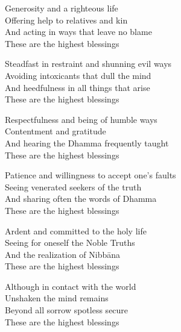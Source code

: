 \begin{english-only}
  Generosity and a righteous life\\
  Offering help to relatives and kin\\
  And acting in ways that leave no blame\\
  These are the highest blessings
\end{english-only}

\begin{english-only}
  Steadfast in restraint and shunning evil ways\\
  Avoiding intoxicants that dull the mind\\
  And heedfulness in all things that arise\\
  These are the highest blessings
\end{english-only}

\begin{english-only}
  Respectfulness and being of humble ways\\
  Contentment and gratitude\\
  And hearing the Dhamma frequently taught\\
  These are the highest blessings
\end{english-only}

\begin{english-only}
  Patience and willingness to accept one's faults\\
  Seeing venerated seekers of the truth\\
  And sharing often the words of Dhamma\\
  These are the highest blessings
\end{english-only}

\begin{english-only}
  Ardent and committed\makeatletter\hyperlink{endnote48-appendix}\makeatother
  to the holy life\\
  Seeing for oneself the Noble Truths\\
  And the realization of Nibbāna\\
  These are the highest blessings
\end{english-only}

\begin{english-only}
  Although in contact with the world\\
  Unshaken the mind remains\\
  Beyond all sorrow spotless secure\\
  These are the highest blessings
\end{english-only}

